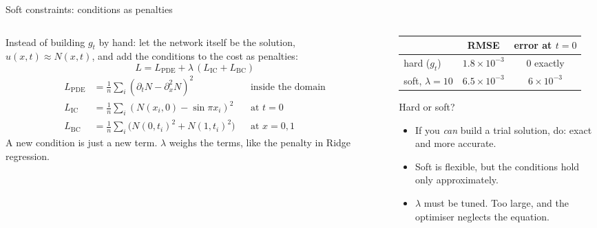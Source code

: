 \documentclass[10pt,aspectratio=169]{beamer}
\begin{document}
\begin{frame}{Soft constraints: conditions as penalties}
\begin{columns}[T]
\begin{column}{0.52\textwidth}
\small
Instead of building $g_t$ by hand: let the network itself be the
solution, $u(x,t)\approx N(x,t)$, and add the conditions to the cost as
penalties:
\[
  L=L_{\mathrm{PDE}}+\lambda\,(L_{\mathrm{IC}}+L_{\mathrm{BC}})
\]
\footnotesize
\vspace{-8pt}
\begin{align*}
  L_{\mathrm{PDE}}&=\tfrac1{n}\textstyle\sum_i(\partial_tN-\partial_x^{2}N)^{2}
     &&\text{inside the domain}\\
  L_{\mathrm{IC}}&=\tfrac1{n}\textstyle\sum_i(N(x_i,0)-\sin\pi x_i)^{2}
     &&\text{at }t=0\\
  L_{\mathrm{BC}}&=\tfrac1{n}\textstyle\sum_i\bigl(N(0,t_i)^{2}+N(1,t_i)^{2}\bigr)
     &&\text{at }x=0,1
\end{align*}
\small
A new condition is just a new term.  $\lambda$ weighs the terms, like the
penalty in Ridge regression.
\end{column}
\begin{column}{0.46\textwidth}
\small
\begin{center}
\begin{tabular}{@{}lcc@{}}
\toprule
& RMSE & error at $t=0$\\
\midrule
hard ($g_t$) & $1.8\times10^{-3}$ & $0$ exactly\\
soft, $\lambda=10$ & $6.5\times10^{-3}$ & $6\times10^{-3}$\\
\bottomrule
\end{tabular}
\end{center}
\begin{block}{Hard or soft?}
\begin{itemize}
  \item If you \emph{can} build a trial solution, do: exact and more
        accurate.
  \item Soft is flexible, but the conditions hold only approximately.
  \item $\lambda$ must be tuned.  Too large, and the optimiser neglects the
        equation.
\end{itemize}
\end{block}
\end{column}
\end{columns}
\end{frame}
\end{document}
